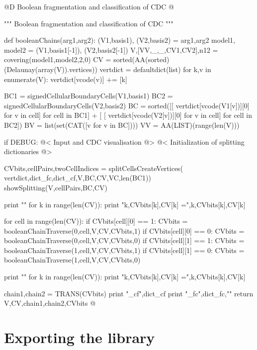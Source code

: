 \documentclass[11pt,oneside]{article}	%
\begin{document}
@D Boolean fragmentation and classification of CDC
@{""" Boolean fragmentation and classification of CDC """

def booleanChains(arg1,arg2):
	(V1,basis1), (V2,basis2) = arg1,arg2
	model1, model2 = (V1,basis1[-1]), (V2,basis2[-1])
	V,[VV,_,_,CV1,CV2],n12 = covering(model1,model2,2,0)
	CV = sorted(AA(sorted)(Delaunay(array(V)).vertices))
	vertdict = defaultdict(list)
	for k,v in enumerate(V): vertdict[vcode(v)] += [k]
	
	BC1 = signedCellularBoundaryCells(V1,basis1)
	BC2 = signedCellularBoundaryCells(V2,basis2)
	BC = sorted([[ vertdict[vcode(V1[v])][0] for v in cell] for cell in BC1] + [ 
			[ vertdict[vcode(V2[v])][0] for v in cell] for cell in BC2])
	BV = list(set(CAT([v for v in BC])))
	VV = AA(LIST)(range(len(V)))

	if DEBUG: 
		@< Input and CDC visualisation @>
	@< Initialization of splitting dictionaries @>
	
	CVbits,cellPairs,twoCellIndices = splitCellsCreateVertices( 
		vertdict,dict_fc,dict_cf,V,BC,CV,VC,len(BC1))
	showSplitting(V,cellPairs,BC,CV)
	
	print "\n"
	for k in range(len(CV)):  print "k,CVbits[k],CV[k] =",k,CVbits[k],CV[k]
	
	for cell in range(len(CV)):
		if CVbits[cell][0] == 1:
			CVbits = booleanChainTraverse(0,cell,V,CV,CVbits,1)		
		if CVbits[cell][0] == 0:
			CVbits = booleanChainTraverse(0,cell,V,CV,CVbits,0)
		if CVbits[cell][1] == 1:
			CVbits = booleanChainTraverse(1,cell,V,CV,CVbits,1)
		if CVbits[cell][1] == 0:
			CVbits = booleanChainTraverse(1,cell,V,CV,CVbits,0)
	
	print "\n"
	for k in range(len(CV)):  print "k,CVbits[k],CV[k] =",k,CVbits[k],CV[k]
	
	chain1,chain2 = TRANS(CVbits)
	print "\ndict_cf",dict_cf
	print "\ndict_fc",dict_fc,"\n"
	return V,CV,chain1,chain2,CVbits
@}



\section{Exporting the library}
\end{document}
